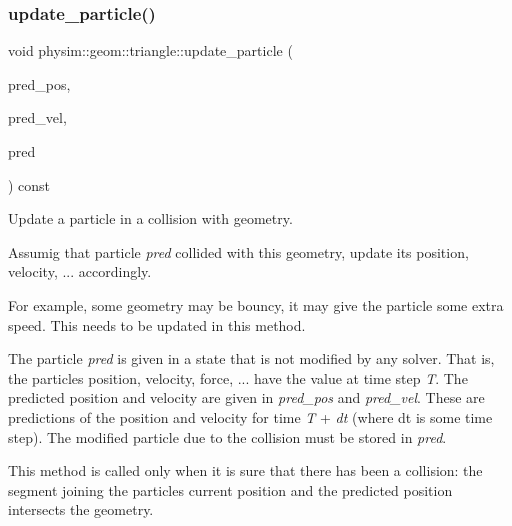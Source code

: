 \mbox{\label{classphysim_1_1geom_1_1triangle_acb8405efe13b22987018916e5011c247}} 
\subsubsection{\texorpdfstring{update\+\_\+particle()}{update\_particle()}}
{\footnotesize\ttfamily void physim\+::geom\+::triangle\+::update\+\_\+particle (\begin{DoxyParamCaption}\item[{const \hyperlink{structphysim_1_1math_1_1vec3}{math\+::vec3} \&}]{pred\+\_\+pos,  }\item[{const \hyperlink{structphysim_1_1math_1_1vec3}{math\+::vec3} \&}]{pred\+\_\+vel,  }\item[{\hyperlink{classphysim_1_1particles_1_1free__particle}{particles\+::free\+\_\+particle} $\ast$}]{pred }\end{DoxyParamCaption}) const\hspace{0.3cm}{\ttfamily [virtual]}}



Update a particle in a collision with geometry. 

Assumig that particle {\itshape pred} collided with this geometry, update its position, velocity, ... accordingly.

For example, some geometry may be \textquotesingle{}bouncy\textquotesingle{}, it may give the particle some extra speed. This needs to be updated in this method.

The particle {\itshape pred} is given in a state that is not modified by any solver. That is, the particle\textquotesingle{}s position, velocity, force, ... have the value at time step {\itshape T}. The predicted position and velocity are given in {\itshape pred\+\_\+pos} and {\itshape pred\+\_\+vel}. These are predictions of the position and velocity for time {\itshape T} + {\itshape dt} (where dt is some time step). The modified particle due to the collision must be stored in {\itshape pred}.

This method is called only when it is sure that there has been a collision\+: the segment joining the particle\textquotesingle{}s current position and the predicted position intersects the geometry.


